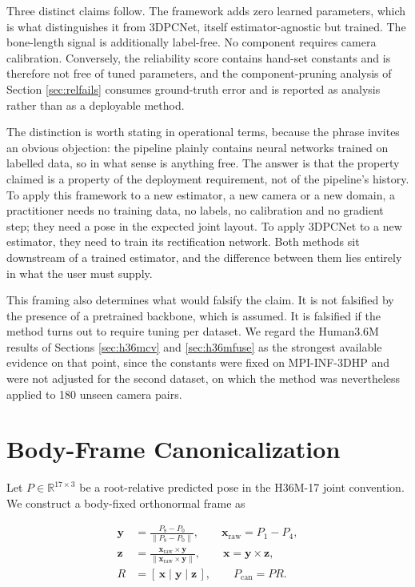 \documentclass[12pt,a4paper]{report}
\begin{document}
Three distinct claims follow. The framework adds zero learned parameters, which is what distinguishes it from 3DPCNet, itself estimator-agnostic but trained. The bone-length signal is additionally label-free. No component requires camera calibration. Conversely, the reliability score contains hand-set constants and is therefore not free of tuned parameters, and the component-pruning analysis of Section \ref{sec:relfails} consumes ground-truth error and is reported as analysis rather than as a deployable method.

The distinction is worth stating in operational terms, because the phrase invites an obvious objection: the pipeline plainly contains neural networks trained on labelled data, so in what sense is anything free. The answer is that the property claimed is a property of the deployment requirement, not of the pipeline's history. To apply this framework to a new estimator, a new camera or a new domain, a practitioner needs no training data, no labels, no calibration and no gradient step; they need a pose in the expected joint layout. To apply 3DPCNet to a new estimator, they need to train its rectification network. Both methods sit downstream of a trained estimator, and the difference between them lies entirely in what the user must supply.

This framing also determines what would falsify the claim. It is not falsified by the presence of a pretrained backbone, which is assumed. It is falsified if the method turns out to require tuning per dataset. We regard the Human3.6M results of Sections \ref{sec:h36mcv} and \ref{sec:h36mfuse} as the strongest available evidence on that point, since the constants were fixed on MPI-INF-3DHP and were not adjusted for the second dataset, on which the method was nevertheless applied to 180 unseen camera pairs.

\section{Body-Frame Canonicalization}
\label{sec:frame}

Let $P \in \mathbb{R}^{17\times 3}$ be a root-relative predicted pose in the H36M-17 joint convention. We construct a body-fixed orthonormal frame as

\begin{align}
\mathbf{y} &= \frac{P_{8} - P_{0}}{\lVert P_{8} - P_{0} \rVert}, \qquad
\mathbf{x}_{\text{raw}} = P_{1} - P_{4}, \\
\mathbf{z} &= \frac{\mathbf{x}_{\text{raw}} \times \mathbf{y}}{\lVert \mathbf{x}_{\text{raw}} \times \mathbf{y} \rVert},
\qquad
\mathbf{x} = \mathbf{y} \times \mathbf{z}, \\
R &= [\,\mathbf{x} \mid \mathbf{y} \mid \mathbf{z}\,], \qquad
P_{\text{can}} = P R .
\end{align}
\end{document}
